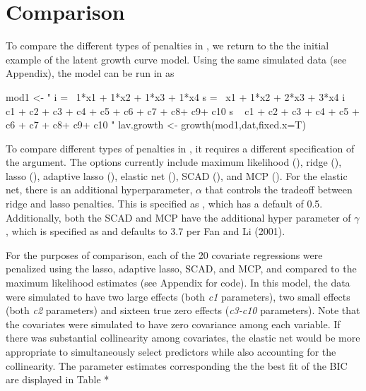 \documentclass[article]{jss}
\begin{document}
\section{Comparison}\label{comparison}

To compare the different types of penalties in , we return
to the the initial example of the latent growth curve model. Using the
same simulated data (see Appendix), the model can be run in 
as

\begin{CodeChunk}
\begin{CodeInput}
mod1 <- "
i =~ 1*x1 + 1*x2 + 1*x3 + 1*x4
s =~ x1 + 1*x2 + 2*x3 + 3*x4
i ~ c1 + c2 + c3 + c4 + c5 + c6 + c7 + c8+ c9+ c10
s ~ c1 + c2 + c3 + c4 + c5 + c6 + c7 + c8+ c9+ c10
"
lav.growth <- growth(mod1,dat,fixed.x=T)
\end{CodeInput}
\end{CodeChunk}

To compare different types of penalties in , it requires a
different specification of the  argument. The options
currently include maximum likelihood (), ridge
(), lasso (), adaptive lasso
(), elastic net (), SCAD (),
and MCP (). For the elastic net, there is an additional
hyperparameter, \(\alpha\) that controls the tradeoff between ridge and
lasso penalties. This is specified as  , which has a
default of 0.5. Additionally, both the SCAD and MCP have the additional
hyper parameter of \(\gamma\), which is specified as  and
defaults to 3.7 per Fan and Li (2001).

For the purposes of comparison, each of the 20 covariate regressions
were penalized using the lasso, adaptive lasso, SCAD, and MCP, and
compared to the maximum likelihood estimates (see Appendix for code). In
this model, the data were simulated to have two large effects (both
\textit{c1} parameters), two small effects (both \textit{c2} parameters)
and sixteen true zero effects (\textit{c3-c10} parameters). Note that
the covariates were simulated to have zero covariance among each
variable. If there was substantial collinearity among covariates, the
elastic net would be more appropriate to simultaneously select
predictors while also accounting for the collinearity. The parameter
estimates corresponding the the best fit of the BIC are displayed in
Table *
\end{document}
